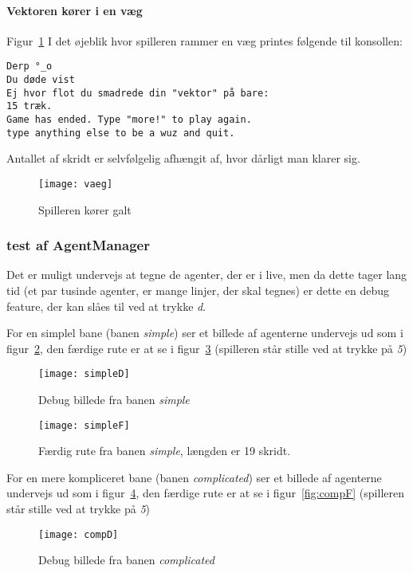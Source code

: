 \paragraph{Vektoren kører i en væg} Figur~\ref{fig:vaeg}
I det øjeblik hvor spilleren rammer en væg printes følgende til konsollen:
\begin{lstlisting}
Derp °_o
Du døde vist
Ej hvor flot du smadrede din "vektor" på bare:
15 træk.
Game has ended. Type "more!" to play again.
type anything else to be a wuz and quit.
\end{lstlisting}
Antallet af skridt er selvfølgelig afhængit af, hvor dårligt man klarer sig.
\begin{figure}[h!]
	\centering
	\texttt{[image: vaeg]}
		\caption{Spilleren kører galt}\label{fig:vaeg}
\end{figure}

\subsubsection{test af AgentManager}
Det er muligt undervejs at tegne de agenter, der er i live, men da dette tager lang tid
(et par tusinde agenter, er mange linjer, der skal tegnes) er dette en debug feature, 
der kan slåes til ved at trykke \emph{d}.

For en simplel bane (banen \emph{simple}) ser et billede af agenterne undervejs ud som i figur~\ref{fig:simpleD},
den færdige rute er at se i figur~\ref{fig:simpleF} (spilleren står stille ved at trykke på \emph{5})

\begin{figure}[h!]
	\centering
	\texttt{[image: simpleD]}
		\caption{Debug billede fra banen \emph{simple}}\label{fig:simpleD}
\end{figure}

\begin{figure}[h!]
	\centering
	\texttt{[image: simpleF]}
		\caption{Færdig rute fra banen \emph{simple}, længden er 19 skridt.}\label{fig:simpleF}
\end{figure}

For en mere kompliceret bane (banen \emph{complicated}) ser et billede af agenterne undervejs ud som i figur~\ref{fig:compD},
den færdige rute er at se i figur~\ref{fig:compF} (spilleren står stille ved at trykke på \emph{5})

\begin{figure}[h!]
	\centering
	\texttt{[image: compD]}
		\caption{Debug billede fra banen \emph{complicated}}\label{fig:compD}
\end{figure}

